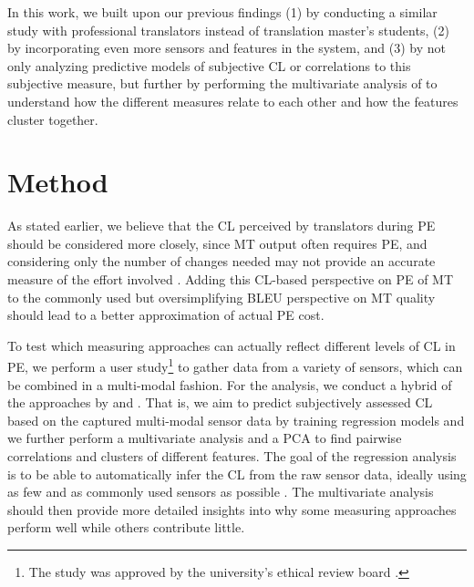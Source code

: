 \documentclass[output=paper]{langsci/langscibook}
\begin{document}
In this work, we built upon our previous findings (1) by conducting a similar study with professional translators instead of translation master's students, (2) by incorporating even more sensors and features in the system, and (3) by not only analyzing predictive models of subjective CL or correlations to this subjective measure, but further by performing the multivariate analysis of \citet{vieira2016measures} to understand how the different measures relate to each other and how the features cluster together.


\section{Method}
As stated earlier, we believe that the CL perceived by translators during PE should be considered more closely, since MT output often requires PE, and considering only the number of changes needed may not provide an accurate measure of the effort involved \citep{koponen2016machine}. %
Adding this CL-based perspective on PE of MT to the commonly used but oversimplifying BLEU  \citep{BLEU:2002} perspective on MT quality should lead to a better approximation of actual PE cost.
%

To test which measuring approaches can actually reflect different levels of CL in PE, we perform a user study\footnote{The study was approved by the university's ethical review board%
.} to gather data from a variety of sensors, which can be combined in a multi-modal fashion.
For the analysis, we conduct a hybrid of the approaches by \citet{herbig2019mt} and \citet{vieira2016measures}. That is, we aim to predict subjectively assessed CL based on the captured multi-modal sensor data by training regression models and we further perform a multivariate analysis and a PCA to find pairwise correlations and clusters of different features.
The goal of the regression analysis is to be able to automatically infer the CL from the raw sensor data, ideally using as few and as commonly used sensors as possible%
. The multivariate analysis should then provide more detailed insights into why some measuring approaches perform well while others contribute little.
\end{document}
